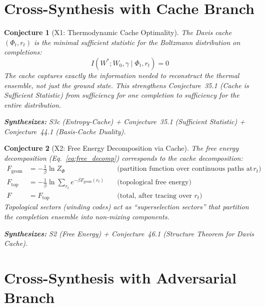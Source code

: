 \documentclass[11pt,letterpaper]{article}
\newtheorem{conjecture}{Conjecture}[section]
\begin{document}
\section{Cross-Synthesis with Cache Branch}

\begin{conjecture}[X1: Thermodynamic Cache 
Optimality]\label{conj:x_cache}
The Davis cache $(\Phi_t, r_t)$ is the minimal sufficient statistic for the 
Boltzmann distribution on completions:
\begin{equation}
    I(W^*; W_0, \gamma \mid \Phi_t, r_t) = 0
\end{equation}
The cache captures exactly the information needed to reconstruct the 
thermal ensemble, not just the ground state. This strengthens 
Conjecture~35.1 (Cache is Sufficient Statistic) from sufficiency for 
\emph{one} completion to sufficiency for the \emph{entire distribution}.

\textbf{Synthesizes:} S3c (Entropy-Cache) + Conjecture~35.1 (Sufficient 
Statistic) + Conjecture~44.1 (Basis-Cache Duality).
\end{conjecture}

\begin{conjecture}[X2: Free Energy 
Decomposition via Cache]\label{conj:x_free_cache}
The free energy decomposition (Eq.~\ref{eq:free_decomp}) corresponds to 
the cache decomposition:
\begin{align}
    F_{\mathrm{geom}} &= -\frac{1}{\beta} \ln Z_\Phi \quad 
    &\text{(partition function over continuous paths at fixed $r_t$)} \\
    F_{\mathrm{top}} &= -\frac{1}{\beta} \ln \sum_{r_t} 
    e^{-\beta F_{\mathrm{geom}}(r_t)} \quad 
    &\text{(topological free energy)} \\
    F &= F_{\mathrm{top}} \quad 
    &\text{(total, after tracing over $r_t$)}
\end{align}
Topological sectors (winding codes) act as ``superselection sectors'' 
that partition the completion ensemble into non-mixing components.

\textbf{Synthesizes:} S2 (Free Energy) + Conjecture~46.1 
(Structure Theorem for Davis Cache).
\end{conjecture}

\section{Cross-Synthesis with Adversarial Branch}
\end{document}
